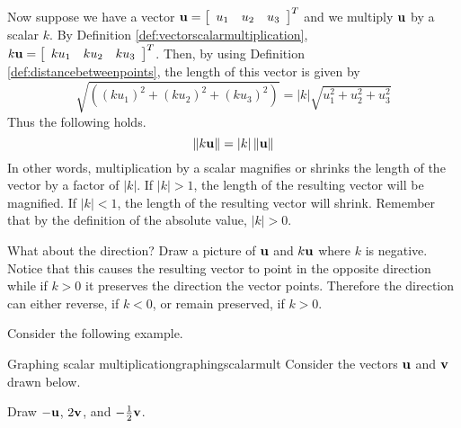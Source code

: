 Now suppose we have a vector ${\bf u} = \left[ 
\begin{array}{lll}
u_1 &  u_2 & u_3 
\end{array}
\right]^T$ and we multiply ${\bf u}$ by a
scalar $k$. By Definition \ref{def:vectorscalarmultiplication},
$k{\bf u} = \left[
\begin{array}{rrr}
ku_{1} & ku_{2} & ku_{3}
\end{array}
\right]^T $. 
Then, by using Definition \ref{def:distancebetweenpoints}, the length of this vector is given by 
\begin{equation*}
\sqrt{\left( \left( k u_{1}\right) ^{2}+\left( k u_{2}\right)
^{2}+\left( k u_{3}\right) ^{2}\right) }=\left\vert k \right\vert
\sqrt{u_{1}^{2}+u_{2}^{2}+u_{3}^{2}}
\end{equation*}
Thus the following holds.
\begin{equation*}
\| k {\bf u} \| =\left\vert k \right\vert
\| {\bf u} \| 
\end{equation*}
In other words, multiplication by a scalar magnifies or shrinks the length
of the vector by a factor of $\left\vert k \right\vert$. If $\left\vert k \right\vert > 1$, the length of the resulting vector will 
be magnified. If $\left\vert k \right\vert <1$, the length of the resulting vector will shrink. Remember that by the definition 
of the absolute value, $\left\vert k \right\vert >0$. 

What about the direction? Draw a picture of ${\bf u}$ and $k{\bf u}$
where $k$ is negative. Notice that this causes the resulting vector
to point in the opposite direction while if $k >0$ it preserves the
direction the vector points. Therefore the direction can either
reverse, if $k < 0$, or remain preserved, if $k > 0$.

Consider the following example.

\begin{example}{Graphing scalar multiplication}{graphingscalarmult}
Consider the vectors ${\bf u}$ and ${\bf v}$ drawn below. 

\begin{center}
\end{center}

Draw  $-{\bf u}$, $2{\bf v}$, and $-\frac{1}{2}{\bf v}$.
\end{example}

